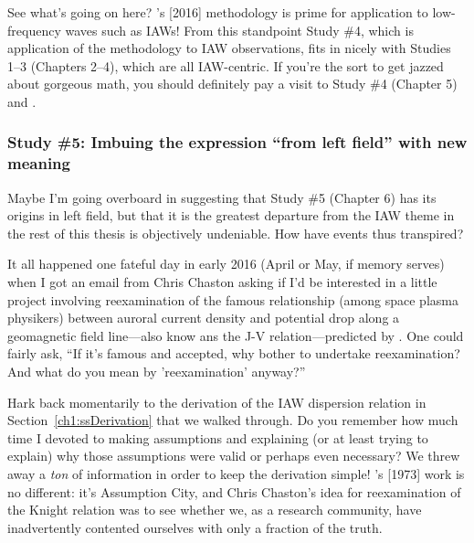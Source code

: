 See what's going on here?  \citeauthor{Bellan2016}'s [2016] methodology is prime
for application to low-frequency waves such as IAWs! From this standpoint Study
\#4, which is application of the \citet{Bellan2016} methodology to IAW
observations, fits in nicely with Studies 1--3 (Chapters 2--4), which are all
IAW-centric. If you're the sort to get jazzed about gorgeous math, you should
definitely pay a visit to Study \#4 (Chapter 5) and \citet{Bellan2016}.

\subsubsection{Study \#5: Imbuing the expression ``from left field'' with new meaning}

Maybe I'm going overboard in suggesting that Study \#5 (Chapter 6) has its
origins in left field, but that it is the greatest departure from the IAW theme
in the rest of this thesis is objectively undeniable. How have events thus transpired?

It all happened one fateful day in early 2016 (April or May, if memory serves)
when I got an email from Chris Chaston asking if I'd be interested in a little
project involving reexamination of the famous relationship (among space plasma
physikers) between auroral current density and potential drop along a
geomagnetic field line---also know ans the J-V relation---predicted by
\citet{Knight1973}. One could fairly ask, ``If it's famous and accepted, why
bother to undertake reexamination? And what do you mean by 'reexamination'
anyway?''

Hark back momentarily to the derivation of the IAW dispersion relation in
Section~\ref{ch1:ssDerivation} that we walked through. Do you remember how much
time I devoted to making assumptions and explaining (or at least trying to
explain) why those assumptions were valid or perhaps even necessary? We threw
away a \emph{ton} of information in order to keep the derivation simple!
\citeauthor{Knight1973}'s [1973] work is no different: it's Assumption City, and
Chris Chaston's idea for reexamination of the Knight relation was to see
whether we, as a research community, have inadvertently contented ourselves with
only a fraction of the truth.

